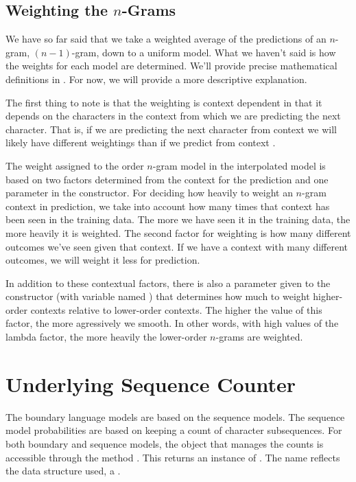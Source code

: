 \subsection{Weighting the $n$-Grams}

We have so far said that we take a weighted average of the predictions
of an $n$-gram, $(n-1)$-gram, down to a uniform model.  What we haven't
said is how the weights for each model are determined.  We'll provide
precise mathematical definitions in .  For now, we
will provide a more descriptive explanation.

The first thing to note is that the weighting is context dependent in
that it depends on the characters in the context from which we are
predicting the next character.  That is, if we are predicting the next
character from context  we will likely have
different weightings than if we predict from context .

The weight assigned to the order $n$-gram model in the interpolated
model is based on two factors determined from the context for the
prediction and one parameter in the constructor.  For deciding how
heavily to weight an $n$-gram context in prediction, we take into
account how many times that context has been seen in the training
data.  The more we have seen it in the training data, the more heavily
it is weighted.  The second factor for weighting is how many different
outcomes we've seen given that context.  If we have a context with
many different outcomes, we will weight it less for prediction.  

In addition to these contextual factors, there is also a parameter
given to the constructor (with variable named )
that determines how much to weight higher-order contexts relative to
lower-order contexts.  The higher the value of this factor, the more
agressively we smooth.  In other words, with high values of the lambda
factor, the more heavily the lower-order $n$-grams are weighted.


\section{Underlying Sequence Counter}

The boundary language models are based on the sequence models.  The
sequence model probabilities are based on keeping a count of character
subsequences.  For both boundary and sequence models, the object that
manages the counts is accessible through the method
.  This returns an instance of
.  The name reflects the data structure used,
a .  

